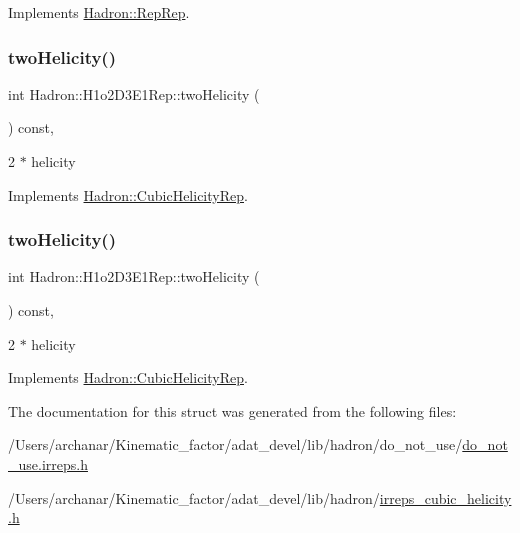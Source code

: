 Implements \mbox{\hyperlink{structHadron_1_1RepRep_ab3213025f6de249f7095892109575fde}{Hadron\+::\+Rep\+Rep}}.

\mbox{\label{structHadron_1_1H1o2D3E1Rep_ad799181c4402996e554f19711fdf3375}} 
\subsubsection{\texorpdfstring{twoHelicity()}{twoHelicity()}\hspace{0.1cm}{\footnotesize\ttfamily [1/2]}}
{\footnotesize\ttfamily int Hadron\+::\+H1o2\+D3\+E1\+Rep\+::two\+Helicity (\begin{DoxyParamCaption}{ }\end{DoxyParamCaption}) const\hspace{0.3cm}{\ttfamily [inline]}, {\ttfamily [virtual]}}

2 $\ast$ helicity 

Implements \mbox{\hyperlink{structHadron_1_1CubicHelicityRep_af507aa56fc2747eacc8cb6c96db31ecc}{Hadron\+::\+Cubic\+Helicity\+Rep}}.

\mbox{\label{structHadron_1_1H1o2D3E1Rep_ad799181c4402996e554f19711fdf3375}} 
\subsubsection{\texorpdfstring{twoHelicity()}{twoHelicity()}\hspace{0.1cm}{\footnotesize\ttfamily [2/2]}}
{\footnotesize\ttfamily int Hadron\+::\+H1o2\+D3\+E1\+Rep\+::two\+Helicity (\begin{DoxyParamCaption}{ }\end{DoxyParamCaption}) const\hspace{0.3cm}{\ttfamily [inline]}, {\ttfamily [virtual]}}

2 $\ast$ helicity 

Implements \mbox{\hyperlink{structHadron_1_1CubicHelicityRep_af507aa56fc2747eacc8cb6c96db31ecc}{Hadron\+::\+Cubic\+Helicity\+Rep}}.



The documentation for this struct was generated from the following files\+:\begin{DoxyCompactItemize}
\item 
/\+Users/archanar/\+Kinematic\+\_\+factor/adat\+\_\+devel/lib/hadron/do\+\_\+not\+\_\+use/\mbox{\hyperlink{do__not__use_8irreps_8h}{do\+\_\+not\+\_\+use.\+irreps.\+h}}\item 
/\+Users/archanar/\+Kinematic\+\_\+factor/adat\+\_\+devel/lib/hadron/\mbox{\hyperlink{lib_2hadron_2irreps__cubic__helicity_8h}{irreps\+\_\+cubic\+\_\+helicity.\+h}}\end{DoxyCompactItemize}
